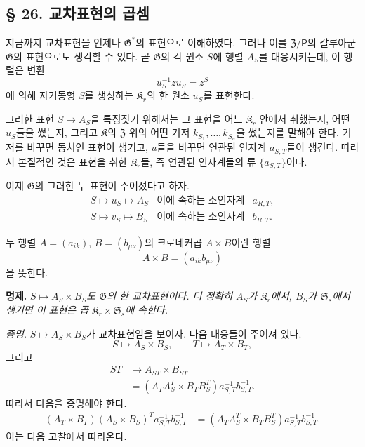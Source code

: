 \subsection*{§ 26. 교차표현의 곱셈}

지금까지 교차표현을 언제나 \(\mathfrak G^*\)의 표현으로 이해하였다. 그러나 이를 \(\mathfrak Z/\mathsf P\)의 갈루아군 \(\mathfrak G\)의 표현으로도 생각할 수 있다. 곧 \(\mathfrak G\)의 각 원소 \(S\)에 행렬 \(A_S\)를 대응시키는데, 이 행렬은 변환
\[
        u_S^{-1}zu_S=z^S
\]
에 의해 자기동형 \(S\)를 생성하는 \(\mathfrak K_r\)의 한 원소 \(u_S\)를 표현한다.

그러한 표현 \(S\mapsto A_S\)을 특징짓기 위해서는 그 표현을 어느 \(\mathfrak K_r\) 안에서 취했는지, 어떤 \(u_S\)들을 썼는지, 그리고 \(\mathfrak K\)의 \(\mathfrak Z\) 위의 어떤 기저 \(k_{S_1},\ldots,k_{S_n}\)을 썼는지를 말해야 한다. 기저를 바꾸면 동치인 표현이 생기고, \(u\)들을 바꾸면 연관된 인자계 \(a_{S,T}\)들이 생긴다. 따라서 본질적인 것은 표현을 취한 \(\mathfrak K_r\)들, 즉 연관된 인자계들의 류 \(\{a_{S,T}\}\)이다.

이제 \(\mathfrak G\)의 그러한 두 표현이 주어졌다고 하자.
\[
\begin{array}{lll}
S\mapsto u_S\mapsto A_S
 &\text{이에 속하는 소인자계}&a_{R,T},\\
S\mapsto v_S\mapsto B_S
 &\text{이에 속하는 소인자계}&b_{R,T}.
\end{array}
\]

두 행렬 \(A=(a_{ik})\), \(B=(b_{\mu\nu})\)의 크로네커곱 \(A\times B\)이란 행렬
\[
        A\times B=(a_{ik}b_{\mu\nu})
\]
을 뜻한다.

\noindent\textbf{명제.} \emph{\(S\mapsto A_S\times B_S\)도 \(\mathfrak G\)의 한 교차표현이다. 더 정확히 \(A_S\)가 \(\mathfrak K_r\)에서, \(B_S\)가 \(\mathfrak S_s\)에서 생기면 이 표현은 곱 \(\mathfrak K_r\times\mathfrak S_s\)에 속한다.}

\noindent\emph{증명.} \(S\mapsto A_S\times B_S\)가 교차표현임을 보이자. 다음 대응들이 주어져 있다.
\[
        S\mapsto A_S\times B_S,
        \qquad
        T\mapsto A_T\times B_T,
\]
그리고
\[
\begin{aligned}
ST&\mapsto A_{ST}\times B_{ST}\\
  &=(A_TA_S^T\times B_TB_S^T)
    a_{S,T}^{-1}b_{S,T}^{-1}.
\end{aligned}
\]
따라서 다음을 증명해야 한다.
\[
\begin{aligned}
(A_T\times B_T)(A_S\times B_S)^T
 a_{S,T}^{-1}b_{S,T}^{-1}
 &=(A_TA_S^T\times B_TB_S^T)
   a_{S,T}^{-1}b_{S,T}^{-1}.
\end{aligned}
\]
이는 다음 고찰에서 따라온다.

